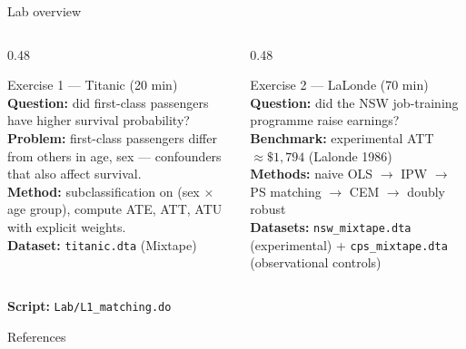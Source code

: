 \documentclass[aspectratio=169, 10pt]{beamer}
\begin{document}
\begin{frame}{Lab overview}

  \begin{columns}[T]
    \begin{column}{0.48\textwidth}
      \begin{block}{Exercise 1 — Titanic (20 min)}
        \textbf{Question:} did first-class passengers have higher survival probability?\\[4pt]
        \textbf{Problem:} first-class passengers differ from others in age, sex --- confounders that also affect survival.\\[4pt]
        \textbf{Method:} subclassification on (sex $\times$ age group), compute ATE, ATT, ATU with explicit weights.\\[4pt]
        \textbf{Dataset:} \texttt{titanic.dta} (Mixtape)
      \end{block}
    \end{column}
    \begin{column}{0.48\textwidth}
      \begin{block}{Exercise 2 — LaLonde (70 min)}
        \textbf{Question:} did the NSW job-training programme raise earnings?\\[4pt]
        \textbf{Benchmark:} experimental ATT $\approx \$1{,}794$ (Lalonde 1986)\\[4pt]
        \textbf{Methods:} naive OLS $\rightarrow$ IPW $\rightarrow$ PS matching $\rightarrow$ CEM $\rightarrow$ doubly robust\\[4pt]
        \textbf{Datasets:} \texttt{nsw\_mixtape.dta} (experimental) + \texttt{cps\_mixtape.dta} (observational controls)
      \end{block}
    \end{column}
  \end{columns}

  \bigskip
  \centering
  \textbf{Script:} \texttt{Lab/L1\_matching.do}
\end{frame}


\begin{frame}[allowframebreaks]{References}
  
\end{frame}
\end{document}

